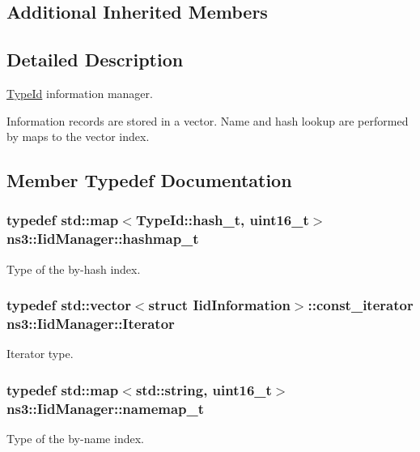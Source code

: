 \subsection*{Additional Inherited Members}


\subsection{Detailed Description}
\hyperlink{classns3_1_1TypeId}{Type\+Id} information manager. 

Information records are stored in a vector. Name and hash lookup are performed by maps to the vector index. 

\subsection{Member Typedef Documentation}
\subsubsection[{\texorpdfstring{hashmap\+\_\+t}{hashmap_t}}]{\setlength{\rightskip}{0pt plus 5cm}typedef std\+::map$<${\bf Type\+Id\+::hash\+\_\+t}, uint16\+\_\+t$>$ {\bf ns3\+::\+Iid\+Manager\+::hashmap\+\_\+t}\hspace{0.3cm}{\ttfamily [private]}}\hypertarget{classns3_1_1IidManager_a18fb4e9506aba477e14ad7dd367dbb29}{}\label{classns3_1_1IidManager_a18fb4e9506aba477e14ad7dd367dbb29}
Type of the by-\/hash index. 
\subsubsection[{\texorpdfstring{Iterator}{Iterator}}]{\setlength{\rightskip}{0pt plus 5cm}typedef std\+::vector$<$struct {\bf Iid\+Information}$>$\+::const\+\_\+iterator {\bf ns3\+::\+Iid\+Manager\+::\+Iterator}\hspace{0.3cm}{\ttfamily [private]}}\hypertarget{classns3_1_1IidManager_adb03042a94452c8e02a5aab760804d1e}{}\label{classns3_1_1IidManager_adb03042a94452c8e02a5aab760804d1e}
Iterator type. 
\subsubsection[{\texorpdfstring{namemap\+\_\+t}{namemap_t}}]{\setlength{\rightskip}{0pt plus 5cm}typedef std\+::map$<$std\+::string, uint16\+\_\+t$>$ {\bf ns3\+::\+Iid\+Manager\+::namemap\+\_\+t}\hspace{0.3cm}{\ttfamily [private]}}\hypertarget{classns3_1_1IidManager_a2b13b1c19ecc94df463fc2edf522655e}{}\label{classns3_1_1IidManager_a2b13b1c19ecc94df463fc2edf522655e}
Type of the by-\/name index. 

